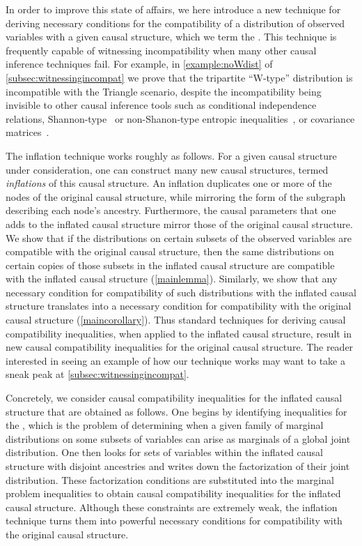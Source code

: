 \documentclass[aps,english,10pt,superscriptaddress,onecolumn,twoside,longbibliography,pra,floatfix,fleqn,nofootinbib]{revtex4-1}
\newcommand*{\tblue}[1]{{\color{MidnightBlue}{\textbf{#1}}}}
\theoremstyle{definition}
\newcounter{example}[section]
\begin{document}
In order to improve this state of affairs, we here introduce a new technique for deriving necessary conditions for the compatibility of a distribution of observed variables with a given causal structure, which we term the {\em\tblue{inflation technique}}. This technique is frequently capable of witnessing incompatibility when many other causal inference techniques fail. For example, in \cref{example:noWdist} of \cref{subsec:witnessingincompat} we prove that the tripartite ``W-type'' distribution is incompatible with the Triangle scenario, despite the incompatibility being invisible to other causal inference tools such as conditional independence relations, Shannon-type~\cite{fritz2013marginal,chaves2014novel,chaves2014informationinference} or non-Shanon-type entropic inequalities~\cite{weilenmann2016entropic}, or covariance matrices~\cite{kela2016covariance}.

The inflation technique works roughly as follows. For a given causal structure under consideration, one can construct many new causal structures, termed {\em inflations} of this causal structure. An inflation duplicates one or more of the nodes of the original causal structure, while mirroring the form of the subgraph describing each node's ancestry. Furthermore, the causal parameters that one adds to the inflated causal structure mirror those of the original causal structure.  We show that if the distributions on certain subsets of the observed variables are compatible with the original causal structure, then the same distributions on certain copies of those subsets in the inflated causal structure are compatible with the inflated causal structure (\cref{mainlemma}).  Similarly, we show that any necessary condition for compatibility of such distributions with the inflated causal structure translates into a necessary condition for compatibility with the original causal structure (\cref{maincorollary}).  Thus standard techniques for deriving causal compatibility inequalities, when applied to the inflated causal structure, result in new causal compatibility inequalities for the original causal structure. The reader interested in seeing an example of how our technique works may want to take a sneak peak at \cref{subsec:witnessingincompat}.

Concretely, we consider causal compatibility inequalities for the inflated causal structure that are obtained as follows.  One begins by identifying inequalities for the \tblue{marginal problem}, which is the problem of determining when a given family of marginal distributions on some subsets of variables can arise as marginals of a global joint distribution. One then looks for sets of variables within the inflated causal structure with disjoint ancestries and writes down the factorization of their joint distribution.  These factorization conditions are substituted into the marginal problem inequalities to obtain causal compatibility inequalities for the inflated causal structure. Although these constraints are extremely weak, the inflation technique turns them into powerful necessary conditions for compatibility with the original causal structure.
\end{document}
